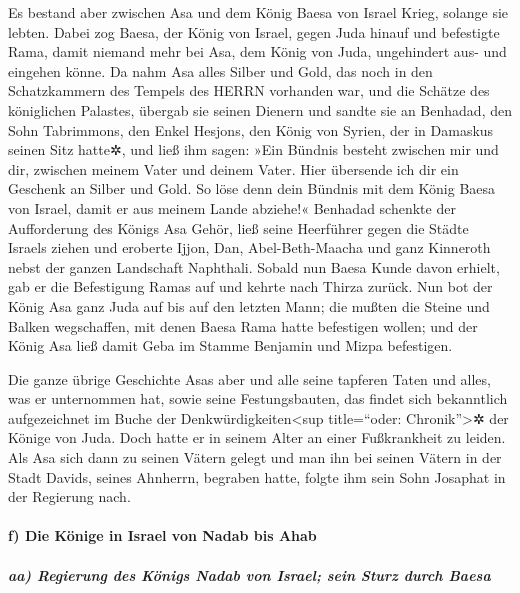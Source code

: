 Es bestand aber zwischen Asa und dem König Baesa von
Israel Krieg, solange sie lebten. Dabei zog Baesa, der
König von Israel, gegen Juda hinauf und befestigte Rama, damit niemand
mehr bei Asa, dem König von Juda, ungehindert aus- und eingehen könne.
Da nahm Asa alles Silber und Gold, das noch in den
Schatzkammern des Tempels des HERRN vorhanden war, und die Schätze des
königlichen Palastes, übergab sie seinen Dienern und sandte sie an
Benhadad, den Sohn Tabrimmons, den Enkel Hesjons, den König von Syrien,
der in Damaskus seinen Sitz hatte✲, und ließ ihm sagen:
»Ein Bündnis besteht zwischen mir und dir, zwischen
meinem Vater und deinem Vater. Hier übersende ich dir ein Geschenk an
Silber und Gold. So löse denn dein Bündnis mit dem König Baesa von
Israel, damit er aus meinem Lande abziehe!« Benhadad
schenkte der Aufforderung des Königs Asa Gehör, ließ seine Heerführer
gegen die Städte Israels ziehen und eroberte Ijjon, Dan,
Abel-Beth-Maacha und ganz Kinneroth nebst der ganzen Landschaft
Naphthali. Sobald nun Baesa Kunde davon erhielt, gab er
die Befestigung Ramas auf und kehrte nach Thirza zurück.
Nun bot der König Asa ganz Juda auf bis auf den letzten
Mann; die mußten die Steine und Balken wegschaffen, mit denen Baesa Rama
hatte befestigen wollen; und der König Asa ließ damit Geba im Stamme
Benjamin und Mizpa befestigen.

Die ganze übrige Geschichte Asas aber und alle seine
tapferen Taten und alles, was er unternommen hat, sowie seine
Festungsbauten, das findet sich bekanntlich aufgezeichnet im Buche der
Denkwürdigkeiten\textless sup title=``oder: Chronik''\textgreater✲ der
Könige von Juda. Doch hatte er in seinem Alter an einer Fußkrankheit zu
leiden. Als Asa sich dann zu seinen Vätern gelegt und man
ihn bei seinen Vätern in der Stadt Davids, seines Ahnherrn, begraben
hatte, folgte ihm sein Sohn Josaphat in der Regierung nach.

\hypertarget{f-die-kuxf6nige-in-israel-von-nadab-bis-ahab}{%
\paragraph{f) Die Könige in Israel von Nadab bis
Ahab}\label{f-die-kuxf6nige-in-israel-von-nadab-bis-ahab}}

\hypertarget{aa-regierung-des-kuxf6nigs-nadab-von-israel-sein-sturz-durch-baesa}{%
\subparagraph{aa) Regierung des Königs Nadab von Israel; sein Sturz
durch
Baesa}\label{aa-regierung-des-kuxf6nigs-nadab-von-israel-sein-sturz-durch-baesa}}

